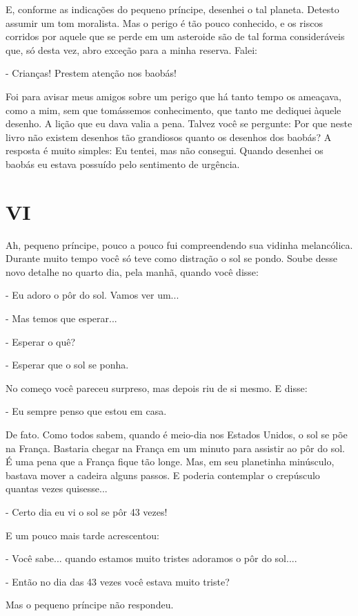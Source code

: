 E, conforme as indicações do pequeno príncipe, desenhei o tal planeta.
Detesto assumir um tom moralista. Mas o perigo é tão pouco conhecido, e
os riscos corridos por aquele que se perde em um asteroide são de tal
forma consideráveis que, só desta vez, abro exceção para a minha
reserva. Falei:

- Crianças! Prestem atenção nos baobás!

Foi para avisar meus amigos sobre um perigo que há tanto tempo os
ameaçava, como a mim, sem que tomássemos conhecimento, que tanto me
dediquei àquele desenho. A lição que eu dava valia a pena. Talvez você
se pergunte: Por que neste livro não existem desenhos tão grandiosos
quanto os desenhos dos baobás? A resposta é muito simples: Eu tentei,
mas não consegui. Quando desenhei os baobás eu estava possuído pelo
sentimento de urgência.

\chapter{VI}

Ah, pequeno príncipe, pouco a pouco fui compreendendo sua vidinha
melancólica. Durante muito tempo você só teve como distração o sol se
pondo. Soube desse novo detalhe no quarto dia, pela manhã, quando você
disse:

- Eu adoro o pôr do sol. Vamos ver um...

- Mas temos que esperar...

- Esperar o quê?

- Esperar que o sol se ponha.

No começo você pareceu surpreso, mas depois riu de si mesmo. E disse:

- Eu sempre penso que estou em casa.

De fato. Como todos sabem, quando é meio-dia nos Estados Unidos, o sol
se põe na França. Bastaria chegar na França em um minuto para assistir
ao pôr do sol. É uma pena que a França fique tão longe. Mas, em seu
planetinha minúsculo, bastava mover a cadeira alguns passos. E poderia
contemplar o crepúsculo quantas vezes quisesse...

- Certo dia eu vi o sol se pôr 43 vezes!

E um pouco mais tarde acrescentou:

- Você sabe... quando estamos muito tristes adoramos o pôr do sol....

- Então no dia das 43 vezes você estava muito triste?

Mas o pequeno príncipe não respondeu.

